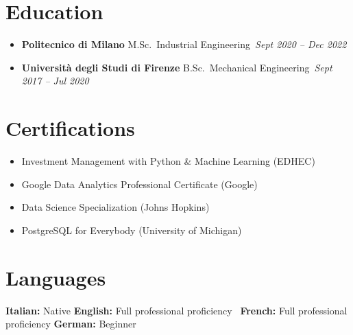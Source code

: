 \documentclass[letterpaper,10.5pt]{article}
\newcommand{\resumeEntry}[4]{
\item\textbf{#1} \hfill #2\
\textit{#3} \hfill \textit{#4}
}
\begin{document}
\section*{Education}
\begin{itemize}[leftmargin=0.2in]
\resumeEntry{Politecnico di Milano}{M.Sc.\ Industrial Engineering}{Sept 2020 -- Dec 2022}{}
\resumeEntry{Università degli Studi di Firenze}{B.Sc.\ Mechanical Engineering}{Sept 2017 -- Jul 2020}{}
\end{itemize}

\section*{Certifications}
\begin{itemize}[leftmargin=0.2in]
\item Investment Management with Python & Machine Learning (EDHEC)
\item Google Data Analytics Professional Certificate (Google)
\item Data Science Specialization (Johns Hopkins)
\item PostgreSQL for Everybody (University of Michigan)
\end{itemize}

\section*{Languages}
\textbf{Italian:} Native \quad \textbf{English:} Full professional proficiency \
\textbf{French:} Full professional proficiency \quad \textbf{German:} Beginner
\end{document}
